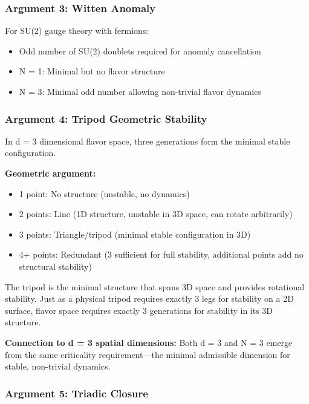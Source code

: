 \subsubsection{Argument 3: Witten Anomaly}

For SU(2) gauge theory with fermions:
\begin{itemize}
    \item Odd number of SU(2) doublets required for anomaly cancellation
    \item N = 1: Minimal but no flavor structure
    \item N = 3: Minimal odd number allowing non-trivial flavor dynamics
\end{itemize}

\subsubsection{Argument 4: Tripod Geometric Stability}

\begin{theorem}
In d = 3 dimensional flavor space, three generations form the minimal stable configuration.
\end{theorem}

\textbf{Geometric argument:}
\begin{itemize}
    \item 1 point: No structure (unstable, no dynamics)
    \item 2 points: Line (1D structure, unstable in 3D space, can rotate arbitrarily)
    \item 3 points: Triangle/tripod (minimal stable configuration in 3D)
    \item 4+ points: Redundant (3 sufficient for full stability, additional points add no structural stability)
\end{itemize}

The tripod is the minimal structure that spans 3D space and provides rotational stability. Just as a physical tripod requires exactly 3 legs for stability on a 2D surface, flavor space requires exactly 3 generations for stability in its 3D structure.

\textbf{Connection to d = 3 spatial dimensions:}
Both d = 3 and N = 3 emerge from the same criticality requirement---the minimal admissible dimension for stable, non-trivial dynamics.

\subsubsection{Argument 5: Triadic Closure}

